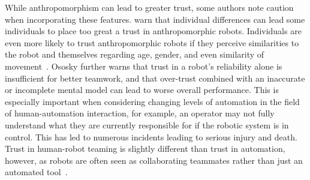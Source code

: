 While anthropomorphism can lead to greater trust, some authors note caution when incorporating these features.
\citeauthor{culley_note_2013} warn that individual differences can lead some individuals to place too great a trust in anthropomorphic robots.
Individuals are even more likely to trust anthropomorphic robots if they perceive similarities to the robot and themselves regarding age, gender, and even similarity of movement~\citep{pak_multi-level_2014, verberne_trusting_2013}.
Ososky further warns that trust in a robot's reliability alone is insufficient for better teamwork, and that over-trust combined with an inaccurate or incomplete mental model can lead to worse overall performance.
This is especially important when considering changing levels of automation in the field of human-automation interaction, for example, an operator may not fully understand what they are currently responsible for if the robotic system is in control.
This has led to numerous incidents leading to serious injury and death.
Trust in human-robot teaming is slightly different than trust in automation, however, as robots are often seen as collaborating teammates rather than just an automated tool~\citep{ososky_building_2013}.

